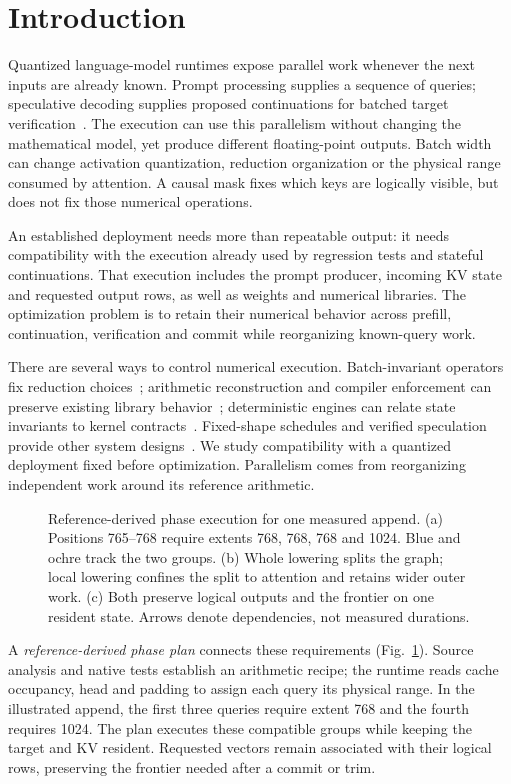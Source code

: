 \section{Introduction}
\label{sec:intro}
Quantized language-model runtimes expose parallel work whenever the next inputs are already known. Prompt processing supplies a sequence of queries; speculative decoding supplies proposed continuations for batched target verification~\cite{leviathan2023,chen2023}. The execution can use this parallelism without changing the mathematical model, yet produce different floating-point outputs. Batch width can change activation quantization, reduction organization or the physical range consumed by attention. A causal mask fixes which keys are logically visible, but does not fix those numerical operations.

An established deployment needs more than repeatable output: it needs compatibility with the execution already used by regression tests and stateful continuations. That execution includes the prompt producer, incoming KV state and requested output rows, as well as weights and numerical libraries. The optimization problem is to retain their numerical behavior across prefill, continuation, verification and commit while reorganizing known-query work.

There are several ways to control numerical execution. Batch-invariant operators fix reduction choices~\cite{thinkingmachines}; arithmetic reconstruction and compiler enforcement can preserve existing library behavior~\cite{taming}; deterministic engines can relate state invariants to kernel contracts~\cite{vosti}. Fixed-shape schedules and verified speculation provide other system designs~\cite{corun,llm42}. We study compatibility with a quantized deployment fixed before optimization. Parallelism comes from reorganizing independent work around its reference arithmetic.

\begin{figure}[t]
\centering

\caption{Reference-derived phase execution for one measured append. (a) Positions 765--768 require extents 768, 768, 768 and 1024. Blue and ochre track the two groups. (b) Whole lowering splits the graph; local lowering confines the split to attention and retains wider outer work. (c) Both preserve logical outputs and the frontier on one resident state. Arrows denote dependencies, not measured durations.}
\label{fig:overview}
\end{figure}

A \emph{reference-derived phase plan} connects these requirements (Fig.~\ref{fig:overview}). Source analysis and native tests establish an arithmetic recipe; the runtime reads cache occupancy, head and padding to assign each query its physical range. In the illustrated append, the first three queries require extent 768 and the fourth requires 1024. The plan executes these compatible groups while keeping the target and KV resident. Requested vectors remain associated with their logical rows, preserving the frontier needed after a commit or trim.

